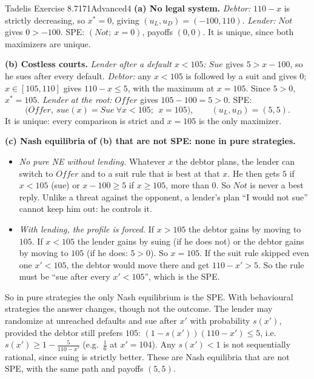 \begin{exsol}{Tadelis Exercise 8.7}{171}{Advanced}{4}
\textbf{(a) No legal system.} \emph{Debtor:} $110 - x$ is strictly decreasing, so $x^* = 0$, giving
$(u_L, u_D) = (-100, 110)$. \emph{Lender:} $\mathit{Not}$ gives $0 > -100$. SPE:
$(\mathit{Not};\ x = 0)$, payoffs $(0,0)$. It is unique, since both maximizers are unique.

\textbf{(b) Costless courts.} \emph{Lender after a default $x<105$:} $\mathit{Sue}$ gives $5 > x - 100$,
so he sues after every default. \emph{Debtor:} any $x<105$ is followed by a suit and gives $0$;
$x \in [105, 110]$ gives $110 - x \le 5$, with the maximum at $x = 105$. Since $5 > 0$, $x^* = 105$.
\emph{Lender at the root:} $\mathit{Offer}$ gives $105 - 100 = 5 > 0$. SPE:
\[
  \bigl(\mathit{Offer},\ \mathit{sue}(x) = \mathit{Sue}\ \forall x < 105;\ \ x = 105\bigr),
  \qquad (u_L,u_D) = (5,5).
\]
It is unique: every comparison is strict and $x = 105$ is the only maximizer.

\textbf{(c) Nash equilibria of (b) that are not SPE: none in pure strategies.}
\begin{itemize}
  \item \emph{No pure NE without lending.} Whatever $x$ the debtor plans, the lender can switch to
  $\mathit{Offer}$ and to a suit rule that is best at that $x$. He then gets $5$ if $x < 105$ (sue)
  or $x - 100 \ge 5$ if $x \ge 105$, more than $0$. So $\mathit{Not}$ is never a best reply. Unlike a threat
  against the opponent, a lender's plan ``I would not sue'' cannot keep him out: he controls it.
  \item \emph{With lending, the profile is forced.} If $x > 105$ the debtor gains by moving to
  $105$. If $x < 105$ the lender gains by suing (if he does not) or the debtor gains by moving to
  $105$ (if he does: $5 > 0$). So $x = 105$. If the suit rule skipped even one $x' < 105$, the
  debtor would move there and get $110 - x' > 5$. So the rule must be ``sue after every
  $x' < 105$'', which is the SPE.
\end{itemize}
So in pure strategies the only Nash equilibrium is the SPE. With behavioural strategies the answer
changes, though not the outcome. The lender may randomize at unreached defaults and sue after
$x'$ with probability $s(x')$, provided the debtor still prefers $105$:
$(1 - s(x'))(110 - x') \le 5$, i.e.\ $s(x') \ge 1 - \frac{5}{110 - x'}$ (e.g.\ $\frac16$ at
$x' = 104$). Any $s(x') < 1$ is not sequentially rational, since suing is strictly better. These are
Nash equilibria that are not SPE, with the same path and payoffs $(5,5)$.


\end{exsol}
